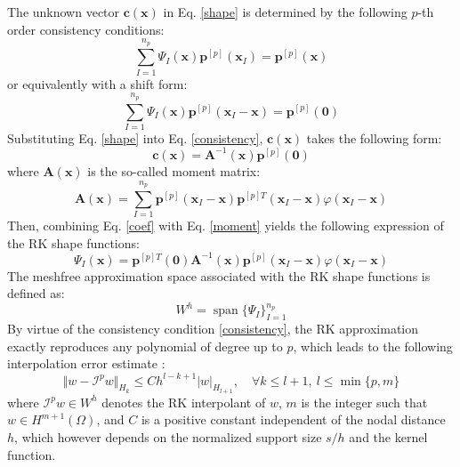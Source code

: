 The unknown vector $\boldsymbol c(\boldsymbol x)$ in Eq. \eqref{shape} is determined by the following $p$-th order consistency conditions:
\begin{equation}\label{consistency}
	\sum_{I=1}^{n_p}\Psi_I(\boldsymbol x) \boldsymbol p^{[p]}(\boldsymbol x_I)=\boldsymbol p^{[p]}(\boldsymbol x)
\end{equation}
or equivalently with a shift form: 
\begin{equation}\label{consistency_shift}
	\sum_{I=1}^{n_p}\Psi_I(\boldsymbol x) \boldsymbol p^{[p]}(\boldsymbol x_I-\boldsymbol x)=\boldsymbol p^{[p]}(\boldsymbol 0)
\end{equation}
Substituting Eq. \eqref{shape} into Eq. \eqref{consistency}, $\boldsymbol c(\boldsymbol x)$ takes the following form:
\begin{equation}\label{coef}
	\boldsymbol c(\boldsymbol x)=\boldsymbol A^{-1}(\boldsymbol x) \boldsymbol p^{[p]}(\boldsymbol 0)
\end{equation}
where $\boldsymbol A(\boldsymbol x)$ is the so-called moment matrix:
\begin{equation}\label{moment}
	\boldsymbol A(\boldsymbol x)=\sum_{I=1}^{n_p}\boldsymbol p^{[p]}(\boldsymbol x_I-\boldsymbol x) \boldsymbol p^{[p]T}(\boldsymbol x_I-\boldsymbol x) \varphi(\boldsymbol x_I-\boldsymbol x)
\end{equation}
Then, combining Eq. \eqref{coef} with Eq. \eqref{moment} yields the following expression of the RK shape functions:
\begin{equation}\label{shape_final}
	\Psi_I(\boldsymbol x)=\boldsymbol p^{[p]T}(\boldsymbol 0) \boldsymbol A^{-1}(\boldsymbol x) \boldsymbol p^{[p]}(\boldsymbol x_I-\boldsymbol x) \varphi(\boldsymbol x_I-\boldsymbol x)
\end{equation}
The meshfree approximation space associated with the RK shape functions is defined as:
\begin{equation}\label{space}
	W^h=\operatorname{span}\{\Psi_I\}_{I=1}^{n_p}
\end{equation}
By virtue of the consistency condition \eqref{consistency}, the RK approximation exactly reproduces any polynomial of degree up to $p$, which leads to the following interpolation error estimate \cite{}:
\begin{equation}\label{interpolation}
	\Vert w - \mathcal I^p w \Vert_{H_k} \le C h^{l-k+1} \vert w \vert_{H_{l+1}}, \quad \forall k \le l+1,\ l \le \min\{p,m\}
\end{equation}
where $\mathcal I^p w\in W^h$ denotes the RK interpolant of $w$, $m$ is the integer such that $w\in H^{m+1}(\Omega)$, and $C$ is a positive constant independent of the nodal distance $h$, which however depends on the normalized support size $s/h$ and the kernel function.

